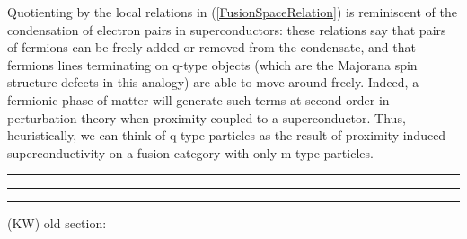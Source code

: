 \documentclass[12pt,a4paper]{article}
\newcommand{\tp}{\otimes}
\newcommand{\cc}{\mathbb{C}}
\newcommand{\kw}[1]{{\color{kwcolor}\footnotesize{(KW) #1}}}
\newcommand{\kwsep}{\bigskip\hrule\medskip\hrule\medskip\hrule\bigskip}
\begin{document}



Quotienting by the local relations in (\ref{FusionSpaceRelation}) is reminiscent of the condensation of electron pairs in superconductors: these relations say that pairs of fermions can be freely added or removed from the condensate, and that fermions lines terminating on q-type objects (which are the Majorana spin structure defects in this analogy) are able to move around freely. 
Indeed, a fermionic phase of matter will generate such terms at second order in perturbation theory when proximity coupled to a superconductor.
Thus, heuristically, we can think of q-type particles as the result of proximity induced superconductivity on a fusion category with only m-type particles.


\kwsep

\kw{old section:}
\end{document}
